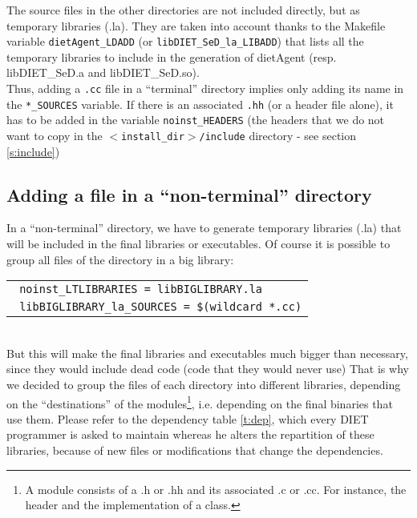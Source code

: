 The source files in the other directories are not included directly, but as
temporary libraries (\textsf{.la}). They are taken into account thanks to the
Makefile variable \texttt{dietAgent\_LDADD} (or
\texttt{libDIET\_SeD\_la\_LIBADD}) that lists all the temporary libraries to
include in the generation of \textsf{dietAgent} (resp. \textsf{libDIET\_SeD.a}
and \textsf{libDIET\_SeD.so}).\\

Thus, adding a \texttt{.cc} file in a ``terminal'' directory implies only adding
its name in the \texttt{*\_SOURCES} variable. If there is an associated
\texttt{.hh} (or a header file alone), it has to be added in the variable
\texttt{noinst\_HEADERS} (the headers that we do not want to copy in the
\texttt{$<$install\_dir$>$/include} directory - see section \ref{s:include})


\subsection{Adding a file in a ``non-terminal'' directory}

In a ``non-terminal'' directory, we have to generate temporary libraries
(\textsf{.la}) that will be included in the final libraries or executables. Of
course it is possible to group all files of the directory in a big library:
\\
\begin{tabular}{l}
\tt
noinst\_LTLIBRARIES = libBIGLIBRARY.la\\
\tt
libBIGLIBRARY\_la\_SOURCES = \$(wildcard *.cc)\\
\end{tabular}
\\
But this will make the final libraries and executables much bigger than
necessary, since they would include dead code (code that they would never use)
That is why we decided to group the files of each directory into different
libraries, depending on the ``destinations'' of the modules\footnote{A module
  consists of a \textsf{.h} or \textsf{.hh} and its associated \textsf{.c} or
  \textsf{.cc}. For instance, the header and the implementation of a class.},
i.e. depending on the final binaries that use them. Please refer to the
dependency table \ref{t:dep}, which every DIET programmer is asked to maintain
whereas he alters the repartition of these libraries, because of new files or
modifications that change the dependencies.
\\

